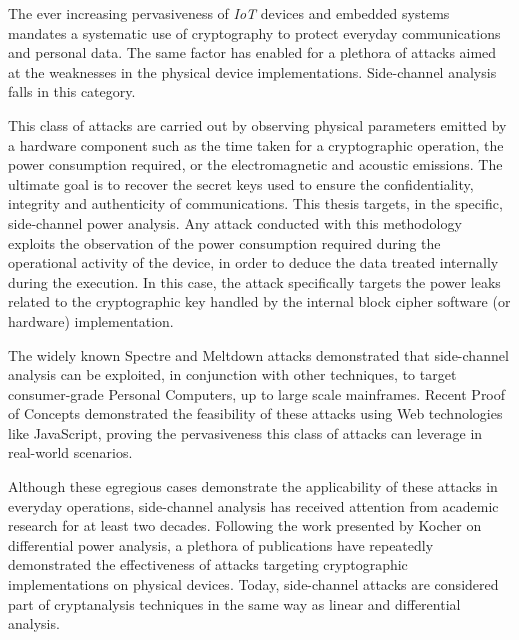 



    

    The ever increasing pervasiveness of \emph{IoT} devices and embedded systems mandates a systematic use of cryptography to protect everyday communications and personal data.
    The same factor has enabled for a plethora of attacks aimed at the weaknesses in the physical device implementations. Side-channel analysis falls in this category.

    This class of attacks are carried out by observing physical parameters emitted by a hardware component such as the time taken for a cryptographic operation, the power consumption required, or the electromagnetic and acoustic emissions. The ultimate goal is to recover the secret keys used to ensure the confidentiality, integrity and authenticity of communications. This thesis targets, in the specific, side-channel power analysis. Any attack conducted with this methodology exploits the observation of the power consumption required during the operational activity of the device, in order to deduce the data treated internally during the execution. In this case, the attack specifically targets the power leaks related to the cryptographic key handled by the internal block cipher software (or hardware) implementation.

    The widely known Spectre and Meltdown attacks demonstrated that side-channel analysis can be exploited, in conjunction with other techniques, to target consumer-grade Personal Computers, up to large scale mainframes. Recent Proof of Concepts demonstrated the feasibility of these attacks using Web technologies like JavaScript, proving the pervasiveness this class of attacks can leverage in real-world scenarios.

    Although these egregious cases demonstrate the applicability of these attacks in everyday operations, side-channel analysis has received attention from academic research for at least two decades. Following the work presented by Kocher on differential power analysis, a plethora of publications have repeatedly demonstrated the effectiveness of attacks targeting cryptographic implementations on physical devices. Today, side-channel attacks are considered part of cryptanalysis techniques in the same way as linear and differential analysis.


